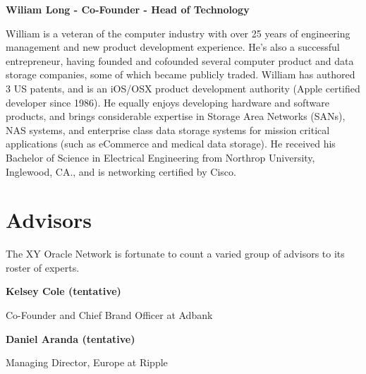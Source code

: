 \documentclass{article}
\begin{document}
\begin {framed}
\begin {center}
\textbf{Wiliam Long - Co-Founder - Head of Technology}\par
\end {center}
William is a veteran of the computer industry with over 25 years of engineering management and new product development experience.  He's also a successful entrepreneur, having founded and cofounded several computer product and data storage companies, some of which became publicly traded.  William has authored 3 US patents, and is an iOS/OSX product development authority (Apple certified developer since 1986).  He equally enjoys developing hardware and software products, and brings considerable expertise in Storage Area Networks (SANs), NAS systems, and enterprise class data storage systems for mission critical applications (such as eCommerce and medical data storage).  He received his Bachelor of Science in Electrical Engineering from Northrop University, Inglewood, CA., and is networking certified by Cisco.
\end {framed}


\section {Advisors}
The XY Oracle Network is fortunate to count a varied group of advisors to its roster of experts.

\begin {framed}
\begin {center}
\textbf{Kelsey Cole (tentative)}\par
\end {center}
Co-Founder and Chief Brand Officer at Adbank
\end {framed}

\begin {framed}
\begin {center}
\textbf{Daniel Aranda (tentative)}\par
\end {center}
Managing Director, Europe at Ripple
\end {framed}

\clearpage
 
\printglossaries
\end{document}
